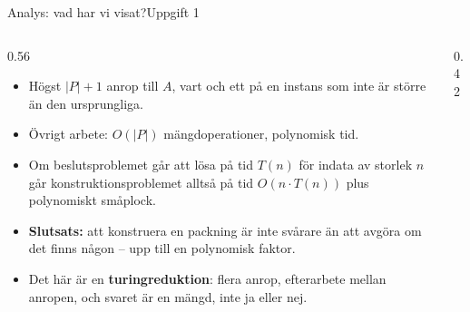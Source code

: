 \documentclass[aspectratio=169,10pt]{beamer}
\begin{document}
\begin{frame}{Analys: vad har vi visat?}{Uppgift 1}
  \begin{columns}[T]
    \begin{column}{0.56\textwidth}
      \begin{itemize}
        \item<1-> Högst $|P|+1$ anrop till $A$, vart och ett på en instans som inte är större än den ursprungliga.
        \item<2-> Övrigt arbete: $O(|P|)$ mängdoperationer, polynomisk tid.
        \item<3-> Om beslutsproblemet går att lösa på tid $T(n)$ för indata av storlek $n$ går konstruktionsproblemet alltså på tid $O(n\cdot T(n))$ plus polynomiskt småplock.
        \item<4-> \textbf{Slutsats:} att konstruera en packning är inte svårare än att avgöra om det finns någon -- upp till en polynomisk faktor.
        \item<5-> Det här är en \textbf{turingreduktion}: flera anrop, efterarbete mellan anropen, och svaret är en mängd, inte ja eller nej.
      \end{itemize}
    \end{column}
    \begin{column}{0.42\textwidth}
      \centering
    \end{column}
  \end{columns}
\end{frame}
\end{document}
